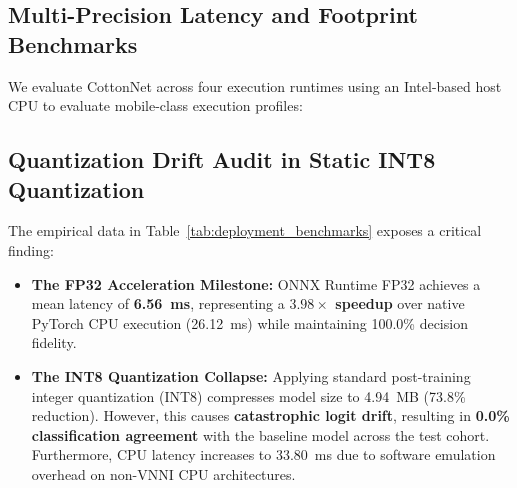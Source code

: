 \documentclass[journal,10pt,twocolumn]{IEEEtran}
\begin{document}
\subsection{Multi-Precision Latency and Footprint Benchmarks}
We evaluate CottonNet across four execution runtimes using an Intel-based host CPU to evaluate mobile-class execution profiles:

\begin{table}[htbp]
\centering
\caption{Multi-Precision Latency, Memory Footprint, and Decision Fidelity Benchmark.}
\label{tab:deployment_benchmarks}
\end{table}

\subsection{Quantization Drift Audit in Static INT8 Quantization}
The empirical data in Table~\ref{tab:deployment_benchmarks} exposes a critical finding:
\begin{itemize}[leftmargin=*]
    \item \textbf{The FP32 Acceleration Milestone:} ONNX Runtime FP32 achieves a mean latency of \textbf{6.56~ms}, representing a \textbf{$3.98\times$ speedup} over native PyTorch CPU execution (26.12~ms) while maintaining 100.0\% decision fidelity.
    \item \textbf{The INT8 Quantization Collapse:} Applying standard post-training integer quantization (INT8) compresses model size to 4.94~MB (73.8\% reduction). However, this causes \textbf{catastrophic logit drift}, resulting in \textbf{0.0\% classification agreement} with the baseline model across the test cohort. Furthermore, CPU latency increases to 33.80~ms due to software emulation overhead on non-VNNI CPU architectures.
\end{itemize}
\end{document}
